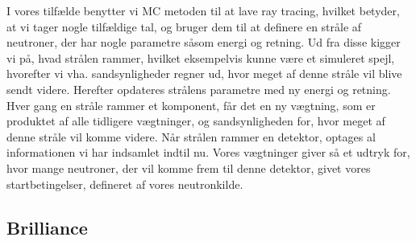 \documentclass[12pt,oneside,a4paper]{article}
\begin{document}
{{{{{I vores tilfælde benytter vi MC metoden til at lave ray tracing, hvilket betyder, at vi tager nogle tilfældige tal, og bruger dem til at definere en stråle af neutroner, der har nogle parametre såsom energi og retning.
Ud fra disse  kigger vi på, hvad strålen rammer, hvilket eksempelvis kunne være et simuleret spejl, hvorefter vi vha. sandsynligheder regner ud, hvor meget af denne stråle vil blive sendt videre. Herefter opdateres strålens parametre med ny energi og retning.
Hver gang en stråle rammer et komponent, får det en ny vægtning, som er produktet af alle tidligere vægtninger, og sandsynligheden for, hvor meget af denne stråle vil komme videre.
Når strålen rammer en detektor, optages al informationen vi har indsamlet indtil nu. Vores vægtninger giver så et udtryk for, hvor mange neutroner, der vil komme frem til denne detektor, givet vores startbetingelser, defineret af vores neutronkilde. \cite{wiki:monte_carlo}

\subsection{Brilliance}

}}}}}
\end{document}
